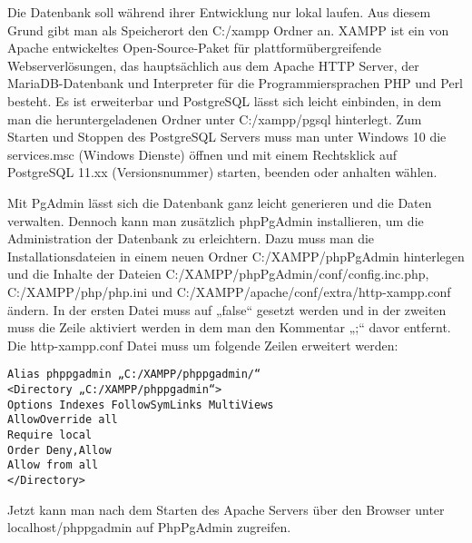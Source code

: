 Die Datenbank soll während ihrer Entwicklung nur lokal laufen. Aus diesem Grund gibt man als Speicherort den C:/xampp Ordner an. XAMPP ist ein von Apache entwickeltes Open-Source-Paket für plattformübergreifende Webserverlösungen, das hauptsächlich aus dem Apache HTTP Server, der MariaDB-Datenbank und Interpreter für die Programmiersprachen PHP und Perl besteht. Es ist erweiterbar und PostgreSQL lässt sich leicht einbinden, in dem man die heruntergeladenen Ordner unter C:/xampp/pgsql hinterlegt. Zum Starten und Stoppen des PostgreSQL Servers muss man unter Windows 10 die services.msc (Windows Dienste) öffnen und mit einem Rechtsklick auf PostgreSQL 11.xx (Versionsnummer) starten, beenden oder anhalten wählen.


Mit PgAdmin lässt sich die Datenbank ganz leicht generieren und die Daten verwalten. Dennoch kann man zusätzlich phpPgAdmin installieren, um die Administration der Datenbank zu erleichtern.\cite{PostgreSQLVerwaltungstools} Dazu muss man die Installationsdateien in einem neuen Ordner C:/XAMPP/phpPgAdmin hinterlegen und die Inhalte der Dateien C:/XAMPP/phpPgAdmin/conf/config.inc.php, C:/XAMPP/php/php.ini und C:/XAMPP/apache/conf/extra/http-xampp.conf ändern. In der ersten Datei muss  auf „false“ gesetzt werden und in der zweiten muss die Zeile  aktiviert werden in dem man den Kommentar „;“ davor entfernt. Die http-xampp.conf Datei muss um folgende Zeilen erweitert werden: 

\begin{verbatim}
Alias phppgadmin „C:/XAMPP/phppgadmin/“
<Directory „C:/XAMPP/phppgadmin“>
Options Indexes FollowSymLinks MultiViews
AllowOverride all
Require local
Order Deny,Allow
Allow from all
</Directory>
 \end{verbatim}

Jetzt kann man nach dem Starten des Apache Servers über den Browser unter localhost/phppgadmin auf PhpPgAdmin zugreifen.
